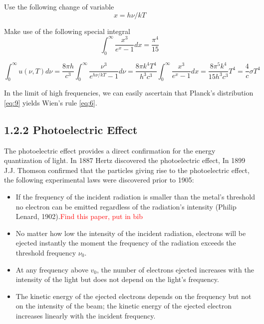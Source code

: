 \documentclass[10pt]{article}
\begin{document}
    Use the following change of variable
    \begin{equation} \label{eq:10.1}
        x=h \nu / k T
    \end{equation}

    Make use of the following special integral
    \begin{equation} \label{eq:10.2}
        \int_0^{\infty} \frac{x^3}{e^x - 1} dx = \frac{\pi^4}{15}
    \end{equation}
    
    \begin{equation} \label{eq:11}
    \int_{0}^{\infty} u(\nu, T) d \nu=\frac{8 \pi h}{c^{3}} \int_{0}^{\infty} \frac{\nu^{3}}{e^{h \nu / k T}-1} d \nu=\frac{8 \pi k^{4} T^{4}}{h^{3} c^{3}} \int_{0}^{\infty} \frac{x^{3}}{e^{x}-1} d x=\frac{8 \pi^{5} k^{4}}{15 h^{3} c^{3}} T^{4}=\frac{4}{c} \sigma T^{4} 
    \end{equation}

    In the limit of high frequencies, we can easily ascertain that Planck's distribution \ref{eq:9} yields Wien's rule \ref{eq:6}.

\subsection*{1.2.2 Photoelectric Effect}
    The photoelectric effect provides a direct confirmation for the energy quantization of light. In 1887 Hertz discovered the photoelectric effect, In 1899 J.J. Thomson confirmed that the particles giving rise to the photoelectric effect, the following experimental laws were discovered prior to 1905:

    \begin{itemize}
      \item If the frequency of the incident radiation is smaller than the metal's threshold no electron can be emitted regardless of the radiation's intensity (Philip Lenard, 1902).\textcolor{red}{Find this paper, put in bib}
      \item No matter how low the intensity of the incident radiation, electrons will be ejected instantly the moment the frequency of the radiation exceeds the threshold frequency $\nu_{0}$.
      \item At any frequency above $v_{0}$, the number of electrons ejected increases with the intensity of the light but does not depend on the light's frequency.
      \item The kinetic energy of the ejected electrons depends on the frequency but not on the intensity of the beam; the kinetic energy of the ejected electron increases linearly with the incident frequency.
    \end{itemize}
\end{document}
